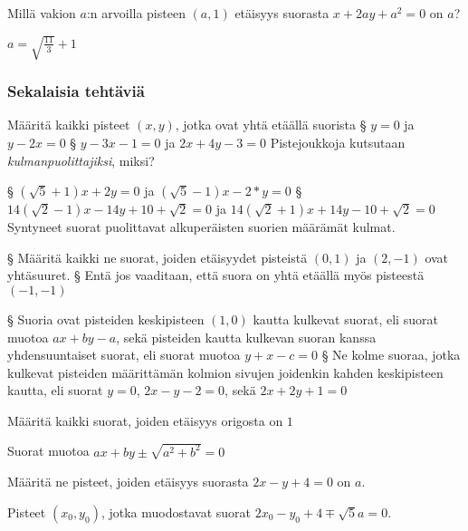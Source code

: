\begin{tehtavasivu}
\begin{tehtava}
Millä vakion $a$:n arvoilla pisteen $(a,1)$ etäisyys suorasta $x+2ay+a^2 = 0$ on $a$?

\begin{vastaus}
$a = \sqrt{\frac{11}{3}}+1$
\end{vastaus} 
\end{tehtava}

\subsubsection*{Sekalaisia tehtäviä}

\begin{tehtava}
Määritä kaikki pisteet $(x,y)$, jotka ovat yhtä etäällä suorista
\alakohdat
§ $y = 0$ ja $y-2x = 0$
§ $y - 3x - 1 = 0$ ja $2x+4y -3= 0$
\loppu
Pistejoukkoja kutsutaan \emph{kulmanpuolittajiksi}, miksi?
\begin{vastaus}
\alakohdat
§ $(\sqrt{5}+1)x +2y = 0$ ja $(\sqrt{5}-1)x-2*y = 0$
§ $14(\sqrt{2}-1)x-14y+10+\sqrt{2} = 0$ ja $14(\sqrt{2}+1)x+14y-10+\sqrt{2} = 0$
Syntyneet suorat puolittavat alkuperäisten suorien määrämät kulmat.
\loppu
\end{vastaus}
\end{tehtava}

\begin{tehtava}
\alakohdat
§ Määritä kaikki ne suorat, joiden etäisyydet pisteistä $(0,1)$ ja $(2,-1)$ ovat yhtäsuuret.
§ Entä jos vaaditaan, että suora on yhtä etäällä myös pisteestä $(-1,-1)$
\loppu
\begin{vastaus}
\alakohdat
§ Suoria ovat pisteiden keskipisteen $(1,0)$ kautta kulkevat suorat, eli suorat muotoa $ax+by-a$, sekä pisteiden kautta kulkevan suoran kanssa yhdensuuntaiset suorat, eli suorat muotoa $y+x-c = 0$
§ Ne kolme suoraa, jotka kulkevat pisteiden määrittämän kolmion sivujen joidenkin kahden keskipisteen kautta, eli suorat $y = 0$, $2x-y-2 = 0$, sekä $2x+2y+1 = 0$
\loppu
\end{vastaus}
\end{tehtava}

\begin{tehtava}
Määritä kaikki suorat, joiden etäisyys origosta on $1$
\begin{vastaus}
Suorat muotoa $ax+by \pm \sqrt{a^2+b^2} = 0$
\end{vastaus}
\end{tehtava}

\begin{tehtava}
  Määritä ne pisteet, joiden etäisyys suorasta $2x-y+4 = 0$ on $a$.
  \begin{vastaus}
    Pisteet $(x_0, y_0)$, jotka muodostavat suorat $2x_0 -y_0 +4 \mp \sqrt{5}a = 0$.
  \end{vastaus}
\end{tehtava}



\end{tehtavasivu}
